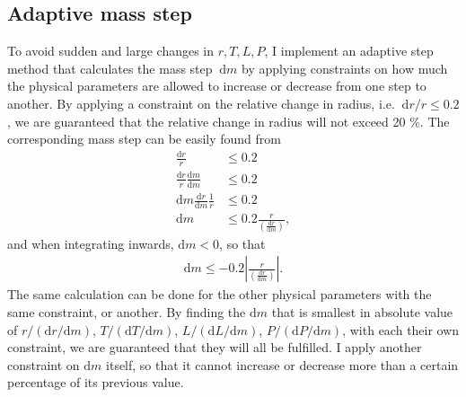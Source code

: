 \documentclass[a4paper, 11pt, english]{article}
\newcommand{\dd}[1]{\ \mathrm{d}#1} %
\newcommand{\D}[1]{\mathrm{d}#1}
\begin{document}
\subsection{Adaptive mass step}
\label{sec:adaptive_mass_step}
To avoid sudden and large changes in $r,T,L,P$, I implement an adaptive step method that
calculates the mass step $\dd{m}$ by applying constraints on how much the physical
parameters are allowed to increase or decrease from one step to another. By applying a
constraint on the relative change in radius, i.e. $\dd{r}/r \leq 0.2$, we are guaranteed
that the relative change in radius will not exceed 20 \%. The corresponding mass step can
be easily found from
\begin{align*}
	\frac{\D{r}}{r} &\leq 0.2 \\
	\frac{\D{r}}{r}\frac{\D{m}}{\D{m}} &\leq 0.2 \\
	\D{m} \frac{\D{r}}{\D{m}} \frac{1}{r} &\leq 0.2 \\
	\D{m} &\leq 0.2 \frac{r}{\left( \frac{\D{r}}{\mathrm{d}m} \right)},
\end{align*}
and when integrating inwards, $\mathrm{d}m < 0$, so that
\begin{align*}
	\mathrm{d}m \leq -0.2 \left| \frac{r}{\left( \frac{\D{r}}{\mathrm{d}m} \right)}\right|.
\end{align*}
The same calculation can be done for the other physical parameters with the same
constraint, or another. By finding the $\D{m}$ that is smallest in absolute value of
$r/(\D{r}/\D{m})$, $T/(\D{T}/\D{m})$, $L/(\D{L}/\D{m})$, $P/(\D{P}/\D{m})$,
with each their own constraint, we are guaranteed
that they will all be fulfilled. I apply another constraint on $\D{m}$ itself, so that it
cannot increase or decrease more than a certain percentage of its previous value.
\end{document}
